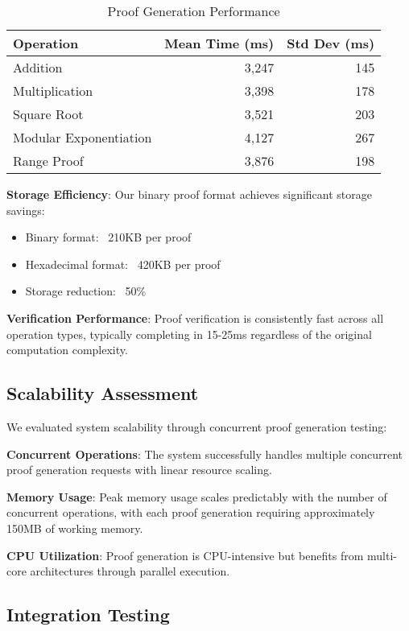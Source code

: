 \documentclass[11pt]{article}
\begin{document}
\begin{table}[ht]
\centering
\caption{Proof Generation Performance}
\label{tab:performance}
\begin{tabular}{lrr}
\toprule
Operation & Mean Time (ms) & Std Dev (ms) \\
\midrule
Addition & 3,247 & 145 \\
Multiplication & 3,398 & 178 \\
Square Root & 3,521 & 203 \\
Modular Exponentiation & 4,127 & 267 \\
Range Proof & 3,876 & 198 \\
\bottomrule
\end{tabular}
\end{table}

\textbf{Storage Efficiency}: Our binary proof format achieves significant storage savings:
\begin{itemize}
\item Binary format: ~210KB per proof
\item Hexadecimal format: ~420KB per proof  
\item Storage reduction: ~50\%
\end{itemize}

\textbf{Verification Performance}: Proof verification is consistently fast across all operation types, typically completing in 15-25ms regardless of the original computation complexity.

\subsection{Scalability Assessment}

We evaluated system scalability through concurrent proof generation testing:

\textbf{Concurrent Operations}: The system successfully handles multiple concurrent proof generation requests with linear resource scaling.

\textbf{Memory Usage}: Peak memory usage scales predictably with the number of concurrent operations, with each proof generation requiring approximately 150MB of working memory.

\textbf{CPU Utilization}: Proof generation is CPU-intensive but benefits from multi-core architectures through parallel execution.

\subsection{Integration Testing}
\end{document}
